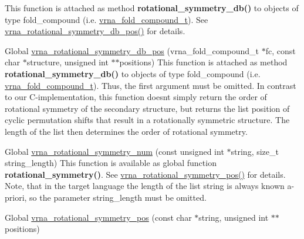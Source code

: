 \begin{DoxyRefList}
%
 This function is attached as method {\bfseries{rotational\+\_\+symmetry\+\_\+db()}} to objects of type {\ttfamily fold\+\_\+compound} (i.\+e. \mbox{\hyperlink{group__fold__compound_ga1b0cef17fd40466cef5968eaeeff6166}{vrna\+\_\+fold\+\_\+compound\+\_\+t}}). See \mbox{\hyperlink{group__combinatorics__utils_ga2a4227ebe28dbc7ad55444a3a1bf7119}{vrna\+\_\+rotational\+\_\+symmetry\+\_\+db\+\_\+pos()}} for details.  
\item[Global \mbox{\hyperlink{group__combinatorics__utils_ga2a4227ebe28dbc7ad55444a3a1bf7119}{vrna\+\_\+rotational\+\_\+symmetry\+\_\+db\+\_\+pos}} (vrna\+\_\+fold\+\_\+compound\+\_\+t $\ast$fc, const char $\ast$structure, unsigned int $\ast$$\ast$positions)]\label{wrappers__wrappers000021}%
%
 This function is attached as method {\bfseries{rotational\+\_\+symmetry\+\_\+db()}} to objects of type {\ttfamily fold\+\_\+compound} (i.\+e. \mbox{\hyperlink{group__fold__compound_ga1b0cef17fd40466cef5968eaeeff6166}{vrna\+\_\+fold\+\_\+compound\+\_\+t}}). Thus, the first argument must be omitted. In contrast to our C-\/implementation, this function doesn\textquotesingle{}t simply return the order of rotational symmetry of the secondary structure, but returns the list {\ttfamily position} of cyclic permutation shifts that result in a rotationally symmetric structure. The length of the list then determines the order of rotational symmetry.  
\item[Global \mbox{\hyperlink{group__combinatorics__utils_gac51464b5281833a58c25f9447252c495}{vrna\+\_\+rotational\+\_\+symmetry\+\_\+num}} (const unsigned int $\ast$string, size\+\_\+t string\+\_\+length)]\label{wrappers__wrappers000016}%
%
 This function is available as global function {\bfseries{rotational\+\_\+symmetry()}}. See \mbox{\hyperlink{group__combinatorics__utils_ga294d48935fcac87ab335d771fe289ecb}{vrna\+\_\+rotational\+\_\+symmetry\+\_\+pos()}} for details. Note, that in the target language the length of the list {\ttfamily string} is always known a-\/priori, so the parameter {\ttfamily string\+\_\+length} must be omitted.  
\item[Global \mbox{\hyperlink{group__combinatorics__utils_ga294d48935fcac87ab335d771fe289ecb}{vrna\+\_\+rotational\+\_\+symmetry\+\_\+pos}} (const char $\ast$string, unsigned int $\ast$$\ast$positions)]\label{wrappers__wrappers000019}%
%

\end{DoxyRefList}

